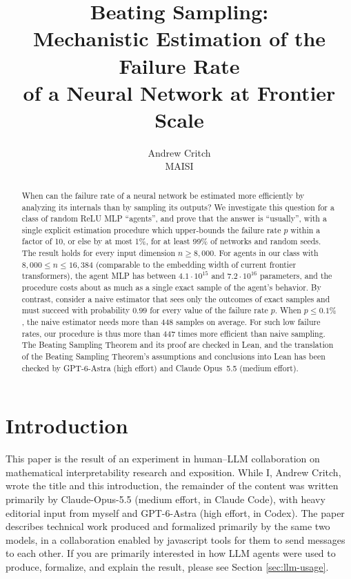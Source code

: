 \documentclass[10pt]{article}
\title{Beating Sampling:\\ Mechanistic Estimation of the Failure Rate\\ of a Neural Network at Frontier Scale}
\author{Andrew Critch\\ MAISI}
\date{}
\begin{document}
\maketitle

\begin{abstract}
When can the failure rate of a neural network be estimated more efficiently by analyzing its internals than by sampling its outputs? We investigate this question for a class of random ReLU MLP ``agents'', and prove that the answer is ``usually'', with a single explicit estimation procedure which upper-bounds the failure rate $p$ within a factor of 10, or else by at most 1\%, for at least 99\% of networks and random seeds. The result holds for every input dimension $n\ge8{,}000$. For agents in our class with $8{,}000\le n\le16{,}384$ (comparable to the embedding width of current frontier transformers), the agent MLP has between $4.1\cdot10^{15}$ and $7.2\cdot10^{16}$ parameters, and the procedure costs about as much as a single exact sample of the agent's behavior. By contrast, consider a naive estimator that sees only the outcomes of exact samples and must succeed with probability $0.99$ for every value of the failure rate $p$. When $p \leq 0.1\%$, the naive estimator needs more than $448$ samples on average. For such low failure rates, our procedure is thus more than $447$ times more efficient than naive sampling. The Beating Sampling Theorem and its proof are checked in Lean, and the translation of the Beating Sampling Theorem's assumptions and conclusions into Lean has been checked by GPT-6-Astra (high effort) and Claude Opus~5.5 (medium effort).
\end{abstract}

\section{Introduction}\label{sec:motivation}

This paper is the result of an experiment in human--LLM collaboration on mathematical interpretability research and exposition.  While I, Andrew Critch, wrote the title and this introduction, the remainder of the content was written primarily by Claude-Opus-5.5 (medium effort, in Claude Code), with heavy editorial input from myself and GPT-6-Astra (high effort, in Codex). The paper describes technical work produced and formalized primarily by the same two models, in a collaboration enabled by javascript tools for them to send messages to each other. If you are primarily interested in how LLM agents were used to produce, formalize, and explain the result, please see Section \ref{sec:llm-usage}. 
\end{document}
